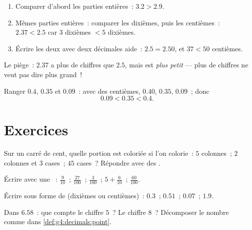 \begin{method}\label{met:g4:decimals:compare}
\begin{enumerate}
  \item Comparer d'abord les parties entières~: $3.2 > 2.9$.
  \item Mêmes parties entières~: comparer les dixièmes, puis les
        centièmes~: $2.37 < 2.5$ car $3$ dixièmes $< 5$ dixièmes.
  \item Écrire les deux avec deux décimales aide~: $2.5 = 2.50$, et
        $37 < 50$ centièmes.
\end{enumerate}
Le piège~: $2.37$ a plus de chiffres que $2.5$, mais est
\emph{plus petit} --- plus de chiffres ne veut pas dire plus grand~!
\end{method}

\begin{example}\label{ex:g4:decimals:compare}
Ranger $0.4$, $0.35$ et $0.09$~: avec des centièmes, $0.40$,
$0.35$, $0.09$~; donc
\[
0.09 < 0.35 < 0.4 .
\]
\end{example}

\section{Exercices}

\begin{exercise}[$\star$]\label{exo:g4:decimals:1}
Sur un carré de cent, quelle portion est coloriée si l'on colorie~:
$5$ colonnes~; $2$ colonnes et $3$ cases~; $45$ cases~? Répondre
avec des .
\end{exercise}

\begin{exercise}[$\star$]\label{exo:g4:decimals:2}
Écrire avec une ~:
$\frac{9}{10}$~; \quad $\frac{27}{100}$~; \quad $\frac{3}{100}$~; \quad
$5 + \frac{6}{10}$~; \quad $\frac{60}{100}$.
\end{exercise}

\begin{exercise}[$\star$]\label{exo:g4:decimals:3}
Écrire sous forme de  (dixièmes ou centièmes)~:
$0.3$~; \quad $0.51$~; \quad $0.07$~; \quad $1.9$.
\end{exercise}

\begin{exercise}[$\star$]\label{exo:g4:decimals:4}
Dans $6.58$~: que compte le chiffre $5$~? Le chiffre $8$~?
Décomposer le nombre comme dans \cref{def:g4:decimals:point}.
\end{exercise}

